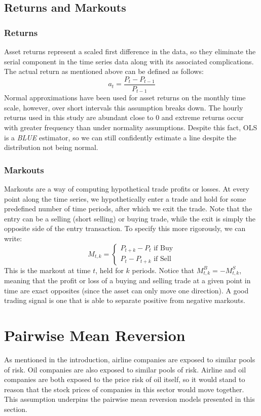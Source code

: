 \documentclass{article}
\begin{document}
\subsection{Returns and Markouts}
\subsubsection{Returns}
Asset returns represent 
a scaled first difference in the data, so they eliminate the serial component in the 
time series data along with its associated complications. The actual return 
as mentioned above can be defined as follows:
$$a_t = \frac{P_t - P_{t-1}}{P_{t-1}}$$
Normal approximations
have been used for asset returns on the monthly time scale, however, over short intervals this
assumption breaks down. The hourly returns used in this study are abundant close to 0 and 
extreme returns occur with greater frequency than under normality assumptions.
Despite this fact, OLS is a \textit{BLUE} estimator, so we can still confidently estimate 
a line despite the distribution not being normal. 
\subsubsection{Markouts}
Markouts are a way of computing hypothetical trade profits or losses. At every point along the
time series, we hypothetically enter a trade and hold for some predefined number of time 
periods, after which we exit the trade. Note that the entry can be a selling (short selling)
or buying trade, while the exit is simply the opposite side of the entry transaction. To 
specify this more rigorously, we can write:
$$M_{t,k} = \begin{cases} 
P_{t+k} - P_t \text { if Buy}\\
P_t - P_{t+k} \text { if Sell}
\end{cases}$$
This is the markout at time $t$, held for $k$ periods. Notice that $M^B_{t,k} = -M^S_{t,k}$,
meaning that the profit or loss of a buying and selling trade at a given point in time are 
exact opposites (since the asset can only move one direction). A good trading signal is one
that is able to separate positive from negative markouts. 

\section{Pairwise Mean Reversion}
As mentioned in the introduction, airline companies are exposed to similar pools of
risk. Oil companies are also exposed to similar pools of risk. Airline and oil companies
are both exposed to the price risk of oil itself, so it would stand to reason that the
stock prices of companies in this sector would move together. This assumption underpins
the pairwise mean reversion models presented in this section.
\end{document}
